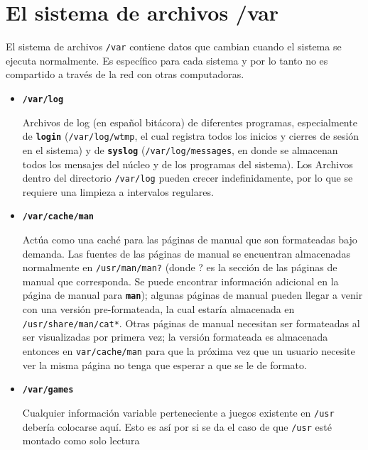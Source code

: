\documentclass[12pt]{article}
\begin{document}
\section{ El sistema de archivos /var}
    
    El sistema de archivos \texttt{/var} contiene datos que
    cambian cuando el sistema se ejecuta normalmente. Es específico para cada
    sistema y por lo tanto no es compartido a través de la red con otras
    computadoras. 

	\begin{itemize}  
	\item 
	\textbf{\texttt{/var/log}} 

	  Archivos de log (en español bitácora) de diferentes
	 programas, especialmente de \texttt{\textbf{login}}
	 (\texttt{/var/log/wtmp}, el cual registra todos los inicios
	 y cierres de sesión en el sistema) y de \texttt{\textbf{syslog}}
	 (\texttt{/var/log/messages}, en donde se almacenan todos
	 los mensajes del núcleo y de los programas del sistema). Los Archivos
	 dentro del directorio \texttt{/var/log} pueden crecer
	 indefinidamente, por lo que se requiere una limpieza a intervalos
	 regulares.   

	\item 
        
	\textbf{\texttt{/var/cache/man}} 
        
	 Actúa como una caché para las páginas de manual que son
	formateadas bajo demanda. Las fuentes de las páginas de manual se
	encuentran almacenadas normalmente en \texttt{/usr/man/man?}
	(donde ? es la sección de las páginas de manual que corresponda. Se
	puede 	encontrar información adicional en la página de manual para
	\texttt{\textbf{man}}); algunas páginas de manual
	pueden 	llegar a venir con una versión pre-formateada, la cual estaría
	almacenada 	en \texttt{/usr/share/man/cat*}. Otras
	páginas de manual necesitan ser formateadas al ser visualizadas por
	primera vez; la versión formateada es almacenada entonces en
	\texttt{var/cache/man} para que la próxima vez que un
	usuario necesite ver la misma página no tenga que esperar a que se le de
	formato.  

	\item 
        
	\textbf{\texttt{/var/games}} 
        
	 Cualquier información variable perteneciente a juegos
	existente en \texttt{/usr} debería colocarse aquí. Esto es
	así por si se da el caso de que \texttt{/usr} esté montado
	como 		solo lectura 


\end{itemize}
\end{document}
